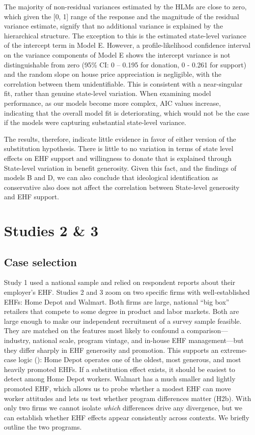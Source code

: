 \documentclass[
  11pt,
  oneside]{article}
\begin{document}
The majority of non-residual variances estimated by the HLMs are close to zero, which given the {[}0, 1{]} range of the response and the magnitude of the residual variance estimate, signify that no additional variance is explained by the hierarchical structure. The exception to this is the estimated state-level variance of the intercept term in Model E. However, a profile-likelihood confidence interval on the variance components of Model E shows the intercept variance is not distinguishable from zero (95\% CI: 0 -- 0.195 for donation, 0 - 0.261 for support) and the random slope on house price appreciation is negligible, with the correlation between them unidentifiable. This is consistent with a near-singular fit, rather than genuine state-level variation. When examining model performance, as our models become more complex, AIC values increase, indicating that the overall model fit is deteriorating, which would not be the case if the models were capturing substantial state-level variance.

The results, therefore, indicate little evidence in favor of either version of the substitution hypothesis. There is little to no variation in terms of state level effects on EHF support and willingness to donate that is explained through State-level variation in benefit generosity. Given this fact, and the findings of models B and D, we can also conclude that ideological identification as conservative also does not affect the correlation between State-level generosity and EHF support.

\section{Studies 2 \& 3}\label{sec-study2-3}

\subsection{Case selection}\label{case-selection}

Study 1 used a national sample and relied on respondent reports about their employer's EHF. Studies 2 and 3 zoom on two specific firms with well-established EHFs: Home Depot and Walmart. Both firms are large, national ``big box'' retailers that compete to some degree in product and labor markets. Both are large enough to make our independent recruitment of a survey sample feasible. They are matched on the features most likely to confound a comparison---industry, national scale, program vintage, and in-house EHF management---but they differ sharply in EHF generosity and promotion. This supports an extreme-case logic (): Home Depot operates one of the oldest, most generous, and most heavily promoted EHFs. If a substitution effect exists, it should be easiest to detect among Home Depot workers. Walmart has a much smaller and lightly promoted EHF, which allows us to probe whether a modest EHF can move worker attitudes and lets us test whether program differences matter (H2b). With only two firms we cannot isolate \emph{which} differences drive any divergence, but we can establish whether EHF effects appear consistently across contexts. We briefly outline the two programs.
\end{document}
